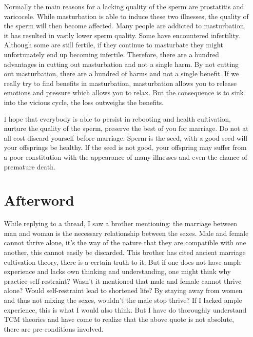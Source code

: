 \documentclass[
]{book}
\begin{document}
Normally the main reasons for a lacking quality of the sperm are prostatitis and varicocele. While masturbation is able to induce these two illnesses, the quality of the sperm will then become affected. Many people are addicted to masturbation, it has resulted in vastly lower sperm quality. Some have encountered infertility. Although some are still fertile, if they continue to masturbate they might unfortunately end up becoming infertile. Therefore, there are a hundred advantages in cutting out masturbation and not a single harm. By not cutting out masturbation, there are a hundred of harms and not a single benefit. If we really try to find benefits in masturbation, masturbation allows you to release emotions and pressure which allows you to relax. But the consequence is to sink into the vicious cycle, the loss outweighs the benefits.

I hope that everybody is able to persist in rebooting and health cultivation, nurture the quality of the sperm, preserve the best of you for marriage. Do not at all cost discard yourself before marriage. Sperm is the seed, with a good seed will your offsprings be healthy. If the seed is not good, your offspring may suffer from a poor constitution with the appearance of many illnesses and even the chance of premature death.

\hypertarget{afterword-7}{%
\section{Afterword}\label{afterword-7}}

While replying to a thread, I saw a brother mentioning: the marriage between man and woman is the necessary relationship between the sexes. Male and female cannot thrive alone, it's the way of the nature that they are compatible with one another, this cannot easily be discarded. This brother has cited ancient marriage cultivation theory, there is a certain truth to it. But if one does not have ample experience and lacks own thinking and understanding, one might think why practice self-restraint? Wasn't it mentioned that male and female cannot thrive alone? Would self-restraint lead to shortened life? By staying away from women and thus not mixing the sexes, wouldn't the male stop thrive? If I lacked ample experience, this is what I would also think. But I have do thoroughly understand TCM theories and have come to realize that the above quote is not absolute, there are pre-conditions involved.
\end{document}
